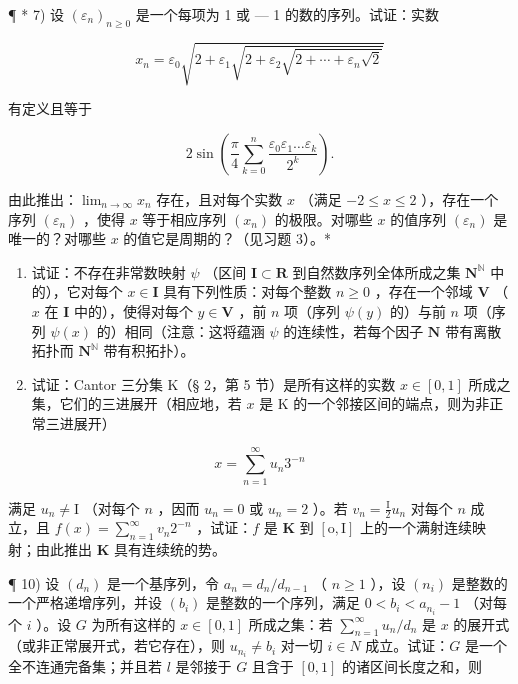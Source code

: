 ¶ * 7) 设 \((\varepsilon_n)_{n \geqslant 0}\) 是一个每项为 1 或 --- 1 的数的序列。试证：实数

\[
x _ {n} = \varepsilon_ {0} \sqrt {2 + \varepsilon_ {1} \sqrt {2 + \varepsilon_ {2} \sqrt {2 + \cdots + \varepsilon_ {n} \sqrt {2}}}}
\]

有定义且等于

\[
2 \sin \left(\frac {\pi}{4} \sum_ {k = 0} ^ {n} \frac {\varepsilon_ {0} \varepsilon_ {1} \dots \varepsilon_ {k}}{2 ^ {k}}\right).
\]

由此推出：\(\lim_{n\to \infty}x_n\) 存在，且对每个实数 \(x\) （满足 \(-2\leqslant x\leqslant 2\) ），存在一个序列 \((\varepsilon_n)\) ，使得 \(x\) 等于相应序列 \((x_{n})\) 的极限。对哪些 \(x\) 的值序列 \((\varepsilon_n)\) 是唯一的？对哪些 \(x\) 的值它是周期的？（见习题 3）。*

\begin{enumerate}
\def\labelenumi{\arabic{enumi})}
\setcounter{enumi}{7}
\item
试证：不存在非常数映射 \(\psi\) （区间 \(\mathbf{I} \subset \mathbf{R}\) 到自然数序列全体所成之集 \(\mathbf{N}^{\mathbb{N}}\) 中的），它对每个 \(x \in \mathbf{I}\) 具有下列性质：对每个整数 \(n \geqslant 0\) ，存在一个邻域 \(\mathbf{V}\) （ \(x\) 在 \(\mathbf{I}\) 中的），使得对每个 \(y \in \mathbf{V}\) ，前 \(n\) 项（序列 \(\psi(y)\) 的）与前 \(n\) 项（序列 \(\psi(x)\) 的）相同（注意：这将蕴涵 \(\psi\) 的连续性，若每个因子 \(\mathbf{N}\) 带有离散拓扑而 \(\mathbf{N}^{\mathbb{N}}\) 带有积拓扑）。
\item
试证：Cantor 三分集 K（§ 2，第 5 节）是所有这样的实数 \(x \in [0, 1]\) 所成之集，它们的三进展开（相应地，若 \(x\) 是 K 的一个邻接区间的端点，则为非正常三进展开）
\end{enumerate}

\[
x = \sum_ {n = 1} ^ {\infty} u _ {n} 3 ^ {- n}
\]

满足 \(u_{n} \neq \mathrm{I}\) （对每个 \(n\) ，因而 \(u_{n} = 0\) 或 \(u_{n} = 2\) ）。若 \(v_{n} = \frac{\mathrm{I}}{2} u_{n}\) 对每个 \(n\) 成立，且 \(f(x) = \sum_{n=1}^{\infty} v_{n} 2^{-n}\) ，试证：\(f\) 是 \(\mathbf{K}\) 到 \([\mathrm{o}, \mathrm{I}]\) 上的一个满射连续映射；由此推出 \(\mathbf{K}\) 具有连续统的势。

¶ 10) 设 \((d_n)\) 是一个基序列，令 \(a_n = d_n / d_{n-1}\) （ \(n \geqslant 1\) ），设 \((n_i)\) 是整数的一个严格递增序列，并设 \((b_i)\) 是整数的一个序列，满足 \(0 < b_i < a_{n_i} - 1\) （对每个 \(i\) ）。设 \(G\) 为所有这样的 \(x \in [0, 1]\) 所成之集：若 \(\sum_{n=1}^{\infty} u_n / d_n\) 是 \(x\) 的展开式（或非正常展开式，若它存在），则 \(u_{n_i} \neq b_i\) 对一切 \(i \in N\) 成立。试证：\(G\) 是一个全不连通完备集；并且若 \(l\) 是邻接于 \(G\) 且含于 \([0, 1]\) 的诸区间长度之和，则

